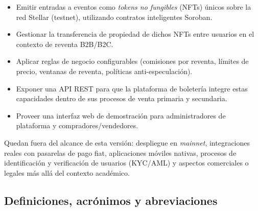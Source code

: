 \documentclass[12pt,letterpaper]{article}
\begin{document}
\begin{itemize}
    \item Emitir entradas a eventos como \textit{tokens no fungibles} (NFTs)
          únicos sobre la red Stellar (testnet), utilizando contratos
          inteligentes Soroban.
    \item Gestionar la transferencia de propiedad de dichos NFTs entre usuarios
          en el contexto de reventa B2B/B2C.
    \item Aplicar reglas de negocio configurables (comisiones por reventa,
          límites de precio, ventanas de reventa, políticas anti-especulación).
    \item Exponer una API REST para que la plataforma de boletería integre
          estas capacidades dentro de sus procesos de venta primaria y
          secundaria.
    \item Proveer una interfaz web de demostración para administradores de
          plataforma y compradores/vendedores.
\end{itemize}

Quedan fuera del alcance de esta versión: despliegue en \textit{mainnet},
integraciones reales con pasarelas de pago fiat, aplicaciones móviles nativas,
procesos de identificación y verificación de usuarios (KYC/AML) y aspectos
comerciales o legales más allá del contexto académico.

\subsection{Definiciones, acrónimos y abreviaciones}
\end{document}
